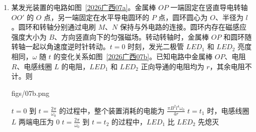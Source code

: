 \documentclass[\gkver]{gaokaozhenti}
\begin{document}
\begin{enumerate}
{由几何关系可知，粒子在磁场中运动轨迹对应的圆心角为 $\theta = 60^\circ$，则粒子在磁场内的运动时间 $t = \frac{\theta}{2\pi} \cdot \frac{2\pi r}{v_0} = \frac{\pi m}{3qB}$，故 C 正确，D 错误。

故选 C。
}
\item
某发光装置的电路如图~\ref{2026广西07a}。金属棒 $OP$ 一端固定在竖直导电转轴 $OO'$ 的 $O$ 点，另一端固定在水平导电圆环的 $P$ 点，圆环圆心为 $O$、半径为 $l$。圆环和转轴分别通过电刷 $M$、$N$ 保持与外电路的连接。圆环内存在磁感应强度大小为 $B$、方向竖直向下的匀强磁场。转动转轴时，金属棒 $OP$ 和圆环随转轴一起以角速度逆时针转动。$t = 0$ 时刻，发光二极管 $LED_{1}$ 和 $LED_{2}$ 亮度相同，$\omega$ 随 $t$ 的变化关系如图~\ref{2026广西07b}。已知电路中金属棒 $OP$、电阻 $R$、电感线圈 $L$ 的电阻，$LED_{1}$ 和 $LED_{2}$ 正向导通的电阻均为 $r$，其余电阻不计。则 

{figs/07b.png}

{$t = 0$ 到 $t = \frac{2\pi}{\omega_{0}}$ 的过程中，整个装置消耗的电能为 $\frac{\pi B^{2}l^{4}\omega_{0}}{4r}$}
{$t = t_{1}$ 时，电感线圈 $L$ 两端电压为 0}
{$t = \frac{2\pi}{\omega_{0}}$ 到 $t = t_{2}$ 的过程中，$LED_{1}$ 比 $LED_{2}$ 先熄灭}


\end{enumerate}
\end{document}
